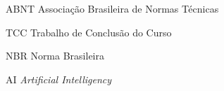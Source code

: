 %
%

\begin{siglas}
	\setlength{\baselineskip}{0.7\baselineskip}
	
    \item[ABNT] Associação Brasileira de Normas Técnicas
    \item[TCC] Trabalho de Conclusão do Curso
    \item[NBR] Norma Brasileira
    \item[AI] \textit{Artificial Intelligency}
    
\end{siglas}


